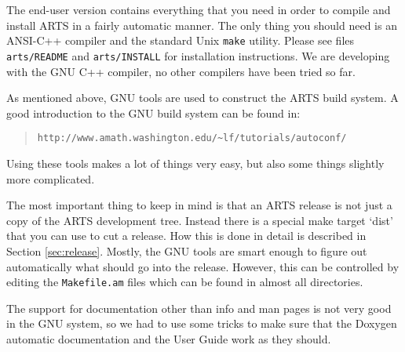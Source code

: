 The end-user version contains everything that you need in order to
compile and install ARTS in a fairly automatic manner. The only
thing you should need is an ANSI-C++ compiler and the standard Unix
\verb|make| utility. Please see files \verb|arts/README| and
\verb|arts/INSTALL| for installation instructions. We are developing
with the GNU C++ compiler, no other compilers have been tried so
far.


As mentioned above, GNU tools are used to construct the ARTS
build system. A good introduction to the GNU build system can be found in:
\begin{quote}
  \footnotesize
  \verb|http://www.amath.washington.edu/~lf/tutorials/autoconf/|
\end{quote}
Using these tools makes a lot of things very easy, but also some
things slightly more complicated.

The most important thing to keep in mind is that an ARTS release
is not just a copy of the ARTS development tree. Instead there is a
special make target `dist' that you can use to cut a release. How this
is done in detail is described in Section \ref{sec:release}. Mostly,
the GNU tools are smart enough to figure out automatically what should
go into the release. However, this can be controlled by editing the
\verb|Makefile.am| files which can be found in almost all directories.

The support for documentation other than info and man pages is not
very good in the GNU system, so we had to use some tricks to make sure
that the Doxygen automatic documentation and the User Guide work as they
should. 



%
%


